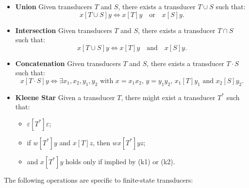 \begin{itemize}
    \item \textbf{Union} Given transducers $T$ and $S$, there exists a transducer $T \cup S$ such that:
    \[
    x[T \cup S]y \iff x[T]y \quad \text{or} \quad x[S]y.
    \]

    \item \textbf{Intersection} Given transducers $T$ and $S$, there exists a transducer $T \cap S$ such that:
    \[
    x[T \cup S]y \iff x[T]y \quad \text{and} \quad x[S]y.
    \]

    \item \textbf{Concatenation} Given transducers $T$ and $S$, there exists a transducer $T \cdot S$ such that:
    \[
    x[T \cdot S]y \iff \exists x_1, x_2, y_1, y_2 \text{ with } x = x_1 x_2,\, y = y_1 y_2,\, x_1[T]y_1 \text{ and } x_2[S]y_2.
    \]

    \item \textbf{Kleene Star} Given a transducer $T$, there might exist a transducer $T^*$ such that:
    \begin{itemize}
        \item[\textbf{(k1)}] $\varepsilon[T^*]\varepsilon$;
        \item[\textbf{(k2)}] if $w[T^*]y$ and $x[T]z$, then $wx[T^*]yz$;
        \item[\textbf{(k3)}] and $x[T^*]y$ holds only if implied by (k1) or (k2).
    \end{itemize}

\end{itemize}

The following operations are specific to finite-state transducers:


